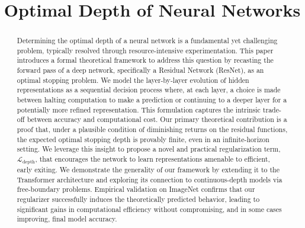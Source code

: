 \documentclass[12pt]{imsart}
\newcommand{\Ldepth}{\mathcal{L}_{\text{depth}}}
\theoremstyle{plain}
\theoremstyle{definition}
\begin{document}
\begin{frontmatter}
\title{Optimal Depth of Neural Networks}
\begin{aug}
\author{ }
\address{Peking University\ Beijing, 100871, P.R. China\ }
\end{aug}

\begin{abstract}
Determining the optimal depth of a neural network is a fundamental yet challenging problem, typically resolved through resource-intensive experimentation. This paper introduces a formal theoretical framework to address this question by recasting the forward pass of a deep network, specifically a Residual Network (ResNet), as an optimal stopping problem. We model the layer-by-layer evolution of hidden representations as a sequential decision process where, at each layer, a choice is made between halting computation to make a prediction or continuing to a deeper layer for a potentially more refined representation. This formulation captures the intrinsic trade-off between accuracy and computational cost. Our primary theoretical contribution is a proof that, under a plausible condition of diminishing returns on the residual functions, the expected optimal stopping depth is provably finite, even in an infinite-horizon setting. We leverage this insight to propose a novel and practical regularization term, $\Ldepth$, that encourages the network to learn representations amenable to efficient, early exiting. We demonstrate the generality of our framework by extending it to the Transformer architecture and exploring its connection to continuous-depth models via free-boundary problems. Empirical validation on ImageNet confirms that our regularizer successfully induces the theoretically predicted behavior, leading to significant gains in computational efficiency without compromising, and in some cases improving, final model accuracy.
\end{abstract}

\begin{keyword}[class=AMS]
\end{keyword}

\begin{keyword}
\end{keyword}
\end{frontmatter}
\end{document}
